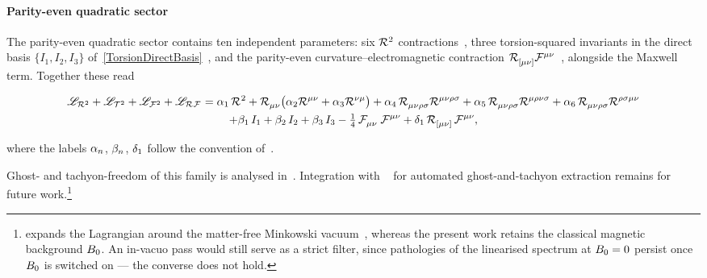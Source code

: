 \paragraph*{Parity-even quadratic sector}
\label{ParityEvenQuadratic}
The parity-even quadratic sector contains ten independent
parameters: six $\MAGF{^2}$ contractions~\cite{lin2019pgt,barker2021hamiltonian,barker2024poincare},
three torsion-squared invariants in the direct basis
$\{I_1,I_2,I_3\}$ of~\cref{TorsionDirectBasis}~\cite{shapiro2002torsion,hayashi1979new},
and the parity-even curvature--electromagnetic contraction
$\MAGF{_{[\mu\nu]}}\FieldF{^{\mu\nu}}$~\cite{bahamonde2025torsion},
alongside the Maxwell term. Together these read
\begin{widetext}
\begin{multline}
  \lag_{\MAGF{^2}}
  +\lag_{\MAGT{^2}}
  +\lag_{\FieldF{^2}}
  +\lag_{\MAGF{} \FieldF{}}
  =
  \Alp{1}\,\MAGF{}^2
  +\MAGF{_{\mu\nu}}\bigl(\Alp{2}\MAGF{^{\mu\nu}}+\Alp{3}\MAGF{^{\nu\mu}}\bigr)
  +\Alp{4}\,\MAGF{_{\mu\nu\rho\sigma}}\MAGF{^{\mu\nu\rho\sigma}}
  +\Alp{5}\,\MAGF{_{\mu\nu\rho\sigma}}\MAGF{^{\mu\rho\nu\sigma}}
  +\Alp{6}\,\MAGF{_{\mu\nu\rho\sigma}}\MAGF{^{\rho\sigma\mu\nu}} \\
  +\Bet{1}\,I_1
  +\Bet{2}\,I_2
  +\Bet{3}\,I_3
  -\tfrac{1}{4}\,\FieldF{_{\mu\nu}}\,\FieldF{^{\mu\nu}}
  +\Del{1}\,\MAGF{_{[\mu\nu]}}\,\FieldF{^{\mu\nu}},
  \label{ParityEvenQuadraticAction}
\end{multline}
\end{widetext}
where the labels $\alpha_{n}$, $\beta_{n}$, $\delta_{1}$ follow the convention
of~\cite{barker2024poincare}.


Ghost- and tachyon-freedom of this family is
analysed
in~\cite{sezgin1980ghostfree,blagojevic2018hamiltonian,aoki2020nonlinear,barker2021hamiltonian}.
Integration with
\PSALTer{}~\cite{barker2024psalter} for automated
ghost-and-tachyon extraction remains for future
work.\footnote{\PSALTer{} expands the Lagrangian
around the matter-free Minkowski
vacuum~\cite{barker2024psalter}, whereas the present work
retains the classical magnetic background $B_0$.
An in-vacuo pass would still serve as a
strict filter, since pathologies of the linearised
spectrum at $B_0=0$ persist once $B_0$ is switched on ---
the converse does not hold.}

